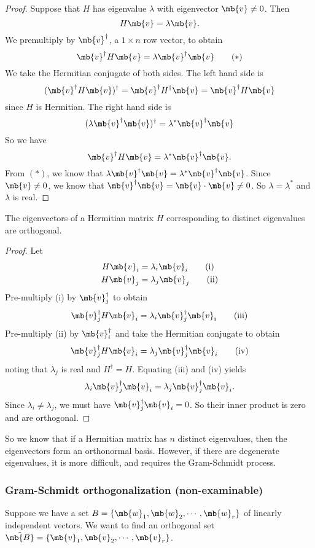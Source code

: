 \documentclass[a4paper]{article}
\begin{document}
\begin{proof}
  Suppose that $H$ has eigenvalue $\lambda$ with eigenvector $\mb{v}\not= 0$. Then
  \[
  H\mb{v} = \lambda\mb{v}.
  \]
We premultiply by $\mb{v}^\dagger$, a $1\times n$ row vector, to obtain
\[
\mb{v}^\dagger H\mb{v} = \lambda \mb{v}^\dagger \mb{v}\tag{$*$}\]
We take the Hermitian conjugate of both sides. The left hand side is
\[
(\mb{v}^\dagger H\mb{v})^\dagger = \mb{v}^\dagger H^\dagger \mb{v} = \mb{v}^\dagger H \mb{v}
\]
since $H$ is Hermitian. The right hand side is
\[
(\lambda\mb{v}^\dagger\mb{v})^\dagger = \lambda^* \mb{v}^\dagger \mb{v}
\]
So we have
\[
\mb{v}^\dagger H\mb{v} = \lambda^* \mb{v}^\dagger \mb{v}.
\]
From $(*)$, we know that $\lambda \mb{v}^\dagger \mb{v} = \lambda^* \mb{v}^\dagger \mb{v}$. Since $\mb{v} \not= 0$, we know that $\mb{v}^\dagger \mb{v} = \mb{v}\cdot \mb{v} \not =0$. So $\lambda = \lambda^*$ and $\lambda$ is real.
\end{proof}

\begin{thm}
  The eigenvectors of a Hermitian matrix $H$ corresponding to distinct eigenvalues are orthogonal. 
\end{thm}

\begin{proof}
  Let
  \begin{align*}
    H\mb{v}_i &= \lambda_i\mb{v}_i\tag{i}\\
    H\mb{v}_j &= \lambda_j\mb{v}_j\tag{ii}
  \end{align*}
  Pre-multiply (i) by $\mb{v}_j^\dagger$ to obtain
\[
\mb{v}_j^\dagger H\mb{v}_i = \lambda_i \mb{v}_j^\dagger \mb{v}_i\tag{iii}
\]
  Pre-multiply (ii) by $\mb{v}_i^\dagger$ and take the Hermitian conjugate to obtain
\[
  \mb{v}_j^\dagger H\mb{v}_i = \lambda_j \mb{v}_j^\dagger \mb{v}_i\tag{iv}
\]
noting that $\lambda_j$ is real and $H^\dagger =H$. Equating (iii) and (iv) yields
\[
\lambda_i \mb{v}_j^\dagger \mb{v}_i = \lambda_j \mb{v}_j^\dagger \mb{v}_i.
\]
Since $\lambda_i\not= \lambda_j$, we must have $\mb{v}_j^\dagger\mb{v}_i = 0$. So their inner product is zero and are orthogonal. 
\end{proof}

So we know that if a Hermitian matrix has $n$ distinct eigenvalues, then the eigenvectors form an orthonormal basis. However, if there are degenerate eigenvalues, it is more difficult, and requires the Gram-Schmidt process.

\subsubsection{Gram-Schmidt orthogonalization (non-examinable)}
Suppose we have a set $B = \{\mb{w}_1, \mb{w}_2, \cdots, \mb{w}_r\}$ of linearly independent vectors. We want to find an orthogonal set $\tilde{\mb{B}} = \{\mb{v}_1, \mb{v}_2, \cdots, \mb{v}_r\}$.
\end{document}
